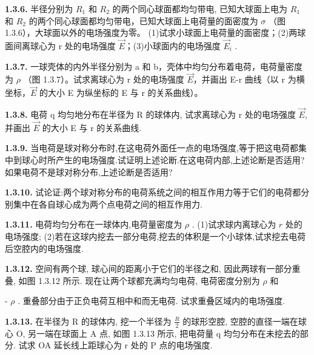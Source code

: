 \newpage
\textbf{1.3.6.} 半径分别为 $R_{1}$ 和 $R_{2}$ 的两个同心球面都均匀带电, 已知大球面上电为 $R_{1}$ 和 $R_{2}$ 的两个同心球面都均匀带电，已知大球面上电荷量的面密度为 $\sigma$ （图 1.3.6），大球面以外的电场强度为零。
(1)试求小球面上电荷量的面密度；(2)两球面间离球心为 r 处的电场强度 $\vec{E}$；(3)小球面内的电场强度 $\vec{E}_{i}$ .


\begin{center}
\end{center}

\vfill

\textbf{1.3.7.} 一球壳体的内外半径分别为 a 和 b，壳体中均匀分布着电荷，电荷量密度为 $\rho$ （图 1.3.7）。试求离球心为 r 处的电场强度 $\vec{E}$，并画出 E-r 曲线（以 r 为横坐标，$\vec{E}$ 的大小 E 为纵坐标的 E 与 r 的关系曲线）。

\vfill

\newpage
\textbf{1.3.8.} 电荷 q 均匀地分布在半径为 R 的球体内, 试求离球心为 r 处的电场强度 $\vec{E}$, 并画出 $\vec{E}$ 的大小 E 与 r 的关系曲线.

\vfill

\textbf{1.3.9.} 当电荷是球对称分布时,在这电荷外面任一点的电场强度,等于把这电荷都集中到球心时所产生的电场强度.试证明上述论断.在这电荷内部,上述论断是否适用?如果电荷不是球对称分布,上述论断是否适用?

\vfill

\newpage
\textbf{1.3.10.} 试论证:两个球对称分布的电荷系统之间的相互作用力等于它们的电荷都分别集中在各自球心成为两个点电荷之间的相互作用力.

\vfill

\textbf{1.3.11.} 电荷均匀分布在一球体内,电荷量密度为 $\rho$ . (1)试求球内离球心为 $r$ 处的电场强度; (2)若在这球内挖去一部分电荷,挖去的体积是一个小球体,试求挖去电荷后空腔内的电场强度.

\vfill

\newpage
\textbf{1.3.12.} 空间有两个球, 球心间的距离小于它们的半径之和, 因此两球有一部分重叠, 如图 1.3.12 所示. 现在让两个球都充满均匀电荷, 电荷密度分别为 $\rho$ 和


- $\rho$ . 重叠部分由于正负电荷互相中和而无电荷. 试求重叠区域内的电场强度.

\begin{center}
\end{center}

\vfill

\textbf{1.3.13.} 在半径为 R 的球体内, 挖一个半径为 $\displaystyle \frac{R}{2}$ 的球形空腔, 空腔的直径一端在球心 O, 另一端在球面上 A 点, 如图 1.3.13 所示, 把电荷量 q 均匀分布在未挖去的部分. 试求 OA 延长线上距球心为 r 处的 P 点的电场强度.

